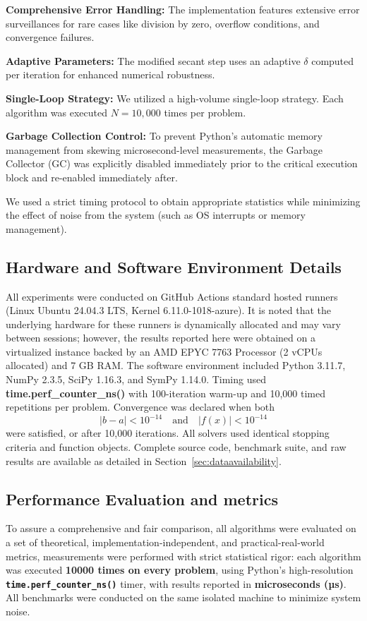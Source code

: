 \documentclass[amsmath, amssymb, aps]{revtex4-2}
\begin{document}
\textbf{Comprehensive Error Handling:} The implementation features extensive error surveillances for rare cases like division by zero, overflow conditions, and convergence failures.

\textbf{Adaptive Parameters:} The modified secant step uses an adaptive \textbf{$\delta$} computed per iteration for enhanced numerical robustness.

\textbf{Single-Loop Strategy:} We utilized a high-volume single-loop strategy. Each algorithm was executed $N=10,000$ times per problem.

\textbf{Garbage Collection Control:} To prevent Python's automatic memory management from skewing microsecond-level measurements, the Garbage Collector (GC) was explicitly disabled immediately prior to the critical execution block and re-enabled immediately after.

We used a strict timing protocol to obtain appropriate statistics while minimizing the effect of noise from the system (such as OS interrupts or memory management).

\subsection{Hardware and Software Environment Details}

All experiments were conducted on GitHub Actions standard hosted runners (Linux Ubuntu 24.04.3 LTS, Kernel 6.11.0-1018-azure). It is noted that the underlying hardware for these runners is dynamically allocated and may vary between sessions; however, the results reported here were obtained on a virtualized instance backed by an AMD EPYC 7763 Processor (2 vCPUs allocated) and 7 GB RAM. The software environment included Python 3.11.7, NumPy 2.3.5, SciPy 1.16.3, and SymPy 1.14.0. Timing used \textbf{time.perf\_counter\_ns()} with 100-iteration warm-up and 10,000 timed repetitions per problem. Convergence was declared when both
\[ |b - a| < 10^{-14} \quad \text{and} \quad |f(x)| < 10^{-14} \]
were satisfied, or after 10,000 iterations. All solvers used identical stopping criteria and function objects. Complete source code, benchmark suite, and raw results are available as detailed in Section~\ref{sec:dataavailability}.

\subsection{Performance Evaluation and metrics}

To assure a comprehensive and fair comparison, all algorithms were evaluated on a set of theoretical, implementation-independent, and practical-real-world metrics, measurements were performed with strict statistical rigor: each algorithm was executed \textbf{10000 times on every problem}, using Python’s high-resolution \textbf{\texttt{time.perf\_counter\_ns()}} timer, with results reported in \textbf{microseconds (µs)}. All benchmarks were conducted on the same isolated machine to minimize system noise.
\end{document}

